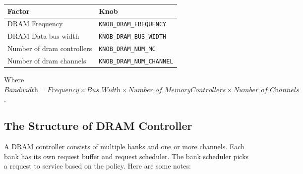\begin{center}
\vspace{0.2in}
\begin{footnotesize}
\begin{tabular}{l l}
Factor                                       & Knob 				     \\ \hline \hline
DRAM Frequency                      		 & \Verb+KNOB_DRAM_FREQUENCY+ \\
DRAM Data bus width                  	 	 & \Verb+KNOB_DRAM_BUS_WIDTH+  \\
Number of dram controllers            	 & \Verb+KNOB_DRAM_NUM_MC+    \\
Number of dram channels                  & \Verb+KNOB_DRAM_NUM_CHANNEL+    \\
\end{tabular}
\end{footnotesize}
\end{center}

\vspace{0.2in}
\noindent
Where $\textit{Bandwidth} = \textit{Frequency} \times \textit{Bus\_Width} \times 
	  \textit{Number\_of\_MemoryControllers} \times \textit{Number\_of\_Channels}$.
	  
\subsection{The Structure of DRAM Controller}

A DRAM controller consists of multiple banks and one or more channels.
Each bank has its own request buffer and request scheduler. The bank
scheduler picks a request to service based on the policy. Here are
some notes:

